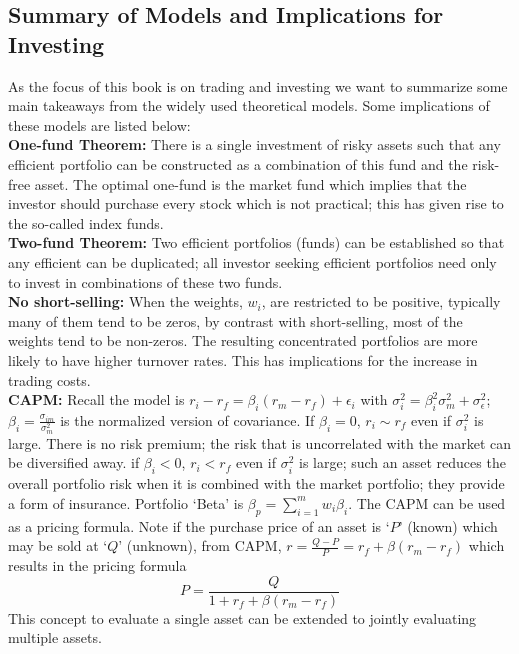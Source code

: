 	
\subsection{Summary of Models and Implications for Investing}


As the focus of this book is on trading and investing we want to summarize some main takeaways from the widely used theoretical models. Some implications of these models are listed below: \\

\noindent\textbf{One-fund Theorem:} There is a single investment of risky assets such that any efficient portfolio can be constructed as a combination of this fund and the risk-free asset. The optimal one-fund is the market fund which implies that the investor should purchase every stock which is not practical; this has given rise to the so-called index funds. \\

\noindent\textbf{Two-fund Theorem:} Two efficient portfolios (funds) can be established so that any efficient can be duplicated; all investor seeking efficient portfolios need only to invest in combinations of these two funds. \\

\noindent \textbf{No short-selling:} When the weights, $w_i$, are restricted to be positive, typically many of them tend to be zeros, by contrast with short-selling, most of the weights tend to be non-zeros. The resulting concentrated portfolios are more likely to have higher turnover rates. This has implications for the increase in trading costs. \\

\noindent\textbf{CAPM:} Recall the model is $r_i-r_f=\beta_i(r_m-r_f)+\epsilon_i$ with $\sigma_i^2=\beta_i^2\sigma^2_m + \sigma_\epsilon^2$; $\beta_i=\frac{\sigma_{im}}{\sigma_m^2}$ is the normalized version of covariance. If $\beta_i=0$, $r_i \sim r_f$ even if $\sigma_i^2$ is large. There is no risk premium; the risk that is uncorrelated with the market can be diversified away. if $\beta_i<0$, $r_i<r_f$ even if $\sigma_i^2$ is large; such an asset reduces the overall portfolio risk when it is combined with the market portfolio; they provide a form of insurance. Portfolio `Beta' is $\beta_p= \sum_{i=1}^m w_i \beta_i$. The CAPM can be used as a pricing formula. Note if the purchase price of an asset is `$P$' (known) which may be sold at `$Q$' (unknown), from CAPM, $r=\frac{Q-P}{P}=r_f+\beta(r_m-r_f)$ which results in the pricing formula
	\begin{equation}\label{eqn:pricing}
	P=\dfrac{Q}{1+r_f+\beta(r_m-r_f)}
	\end{equation}
This concept to evaluate a single asset can be extended to jointly evaluating multiple assets.


